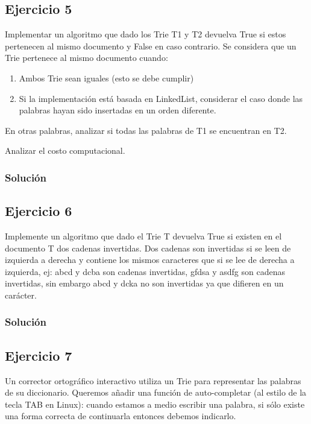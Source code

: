 \documentclass{article}
\begin{document}
\subsection*{Ejercicio 5}
Implementar un algoritmo que dado los Trie T1 y T2 devuelva True si estos pertenecen al mismo documento y False en caso contrario. Se considera que un Trie pertenece al mismo documento cuando:
\begin{enumerate}
    \item Ambos Trie sean iguales (esto se debe cumplir)
    \item Si la implementación está basada en LinkedList, considerar el caso donde las palabras hayan sido insertadas en un orden diferente.
\end{enumerate}
En otras palabras, analizar si todas las palabras de T1 se encuentran en T2.

Analizar el costo computacional.
\subsubsection*{Solución}


\subsection*{Ejercicio 6}
Implemente un algoritmo que dado el Trie T devuelva True si existen en el documento T dos cadenas invertidas. Dos cadenas son invertidas si se leen de izquierda a derecha y contiene los mismos caracteres que si se lee de derecha a izquierda, ej: abcd y dcba son cadenas invertidas, gfdsa y asdfg son cadenas invertidas, sin embargo abcd y dcka no son invertidas ya que difieren en un carácter.
\subsubsection*{Solución}


\pagebreak
\subsection*{Ejercicio 7}
Un corrector ortográfico interactivo utiliza un Trie para representar las palabras de su diccionario. Queremos añadir una función de auto-completar (al estilo de la tecla TAB en Linux): cuando estamos a medio escribir una palabra, si sólo existe una forma correcta de continuarla entonces debemos indicarlo.
\end{document}
